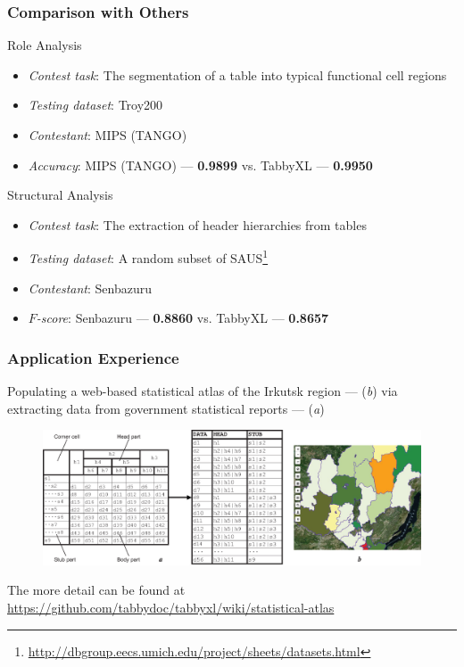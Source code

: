 \documentclass[10pt]{beamer}
\begin{document}
\begin{frame}
\frametitle{Comparison with Others}

\small{
\begin{block}{Role Analysis}
\begin{itemize}
\item \emph{Contest task}: The segmentation of a table into typical functional cell regions
\item \emph{Testing dataset}: Troy200  %
\item \emph{Contestant}: MIPS (TANGO) %
\item \emph{Accuracy}: MIPS (TANGO) --- \textbf{0.9899} vs. TabbyXL --- \textbf{0.9950}
\end{itemize}
\end{block}

\begin{block}{Structural Analysis}
\begin{itemize}
	\item \emph{Contest task}: The extraction of header hierarchies from tables
	\item \emph{Testing dataset}: A random subset of SAUS\footnote{\url{http://dbgroup.eecs.umich.edu/project/sheets/datasets.html}}
	\item \emph{Contestant}: Senbazuru %
	\item $F$\emph{-score}: Senbazuru --- \textbf{0.8860} vs. TabbyXL --- \textbf{0.8657}
\end{itemize}
\end{block}
}
\end{frame}


\begin{frame}
\frametitle{Application Experience}
Populating a web-based statistical atlas of the Irkutsk region --- (\textit{b}) via extracting data from government statistical reports --- (\textit{a})
\begin{figure}
\includegraphics[width=1\linewidth]{application1}
\end{figure}
\tiny{The more detail can be found at \url{https://github.com/tabbydoc/tabbyxl/wiki/statistical-atlas}}
\end{frame}
\end{document}
